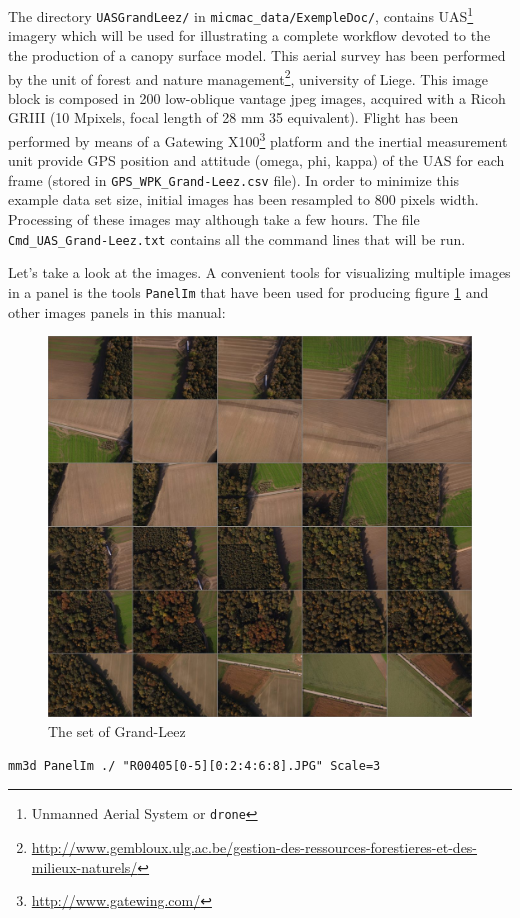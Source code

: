 The directory {\tt UASGrandLeez/} in {\tt micmac\_data/ExempleDoc/}, contains UAS\footnote{Unmanned Aerial System or {\tt drone}} imagery which will be used for illustrating a complete workflow devoted to the the production of a canopy surface model. This aerial survey has been performed by the unit of forest and nature management\footnote{\url{http://www.gembloux.ulg.ac.be/gestion-des-ressources-forestieres-et-des-milieux-naturels/}}, university of Liege. This image block is composed in 200 low-oblique vantage jpeg images, acquired with a Ricoh GRIII (10 Mpixels, focal length of 28 mm 35 equivalent). Flight has been performed by means of a Gatewing X100\footnote{\url{http://www.gatewing.com/}} platform and the inertial measurement unit provide GPS position and attitude (omega, phi, kappa) of the UAS for each frame (stored in {\tt GPS\_WPK\_Grand-Leez.csv} file). In order to minimize this example data set size, initial images has been resampled to 800 pixels width. Processing of these images may although take a few hours. The file {\tt  Cmd\_UAS\_Grand-Leez.txt} contains all the command lines that will be run.

Let's take a look at the images. A convenient tools for visualizing multiple images in a panel is the tools {\tt PanelIm} that have been used for producing figure \ref{FIG:panel-GL} and other images panels in this manual:

\begin{figure}[H]
\centering
\includegraphics[height=0.5\linewidth]{FIGS/UASGrandLeez/PanelGL.JPG}
\caption{The set of Grand-Leez}
\label{FIG:panel-GL}
\end{figure}

\begin{verbatim}
mm3d PanelIm ./ "R00405[0-5][0:2:4:6:8].JPG" Scale=3
\end{verbatim}



